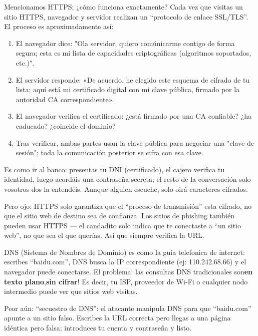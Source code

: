 
Mencionamos HTTPS; ¿cómo funciona exactamente? Cada vez que visitas un sitio HTTPS, navegador y servidor realizan un “protocolo de enlace SSL/TLS”. El proceso es aproximadamente así:

\begin{enumerate}
  \item El navegador dice: "Ola servidor, quiero comúnicarme contigo de forma segura; esta es mi lista de capacidades criptográficas (algoritmos soportados, etc.)".
  \item El servidor responde: «De acuerdo, he elegido este esquema de cifrado de tu lista; aquí está mi certificado digital con mi clave pública, firmado por la autoridad CA correspondiente».
  \item El navegador verifica el certificado: ¿está firmado por una CA confiable? ¿ha caducado? ¿coincide el dominio?
  \item Tras verificar, ambas partes usan la clave pública para negociar una "clave de sesión"; toda la comunicación posterior se cifra con esa clave.
\end{enumerate}

Es como ir al banco: presentas tu DNI (certificado), el cajero verifica tu identidad, luego acordáis una contraseña secreta; el resto de la conversación solo vosotros dos la entendéis. Aunque alguien escuche, solo oirá caracteres cifrados.

Pero ojo: HTTPS solo garantiza que el “proceso de transmisión” esta cifrado, no que el sitio web de destino sea de confianza. Los sitios de phishing también pueden usar HTTPS — el candadito solo indica que te conectaste a “un sitio web”, no que sea el que querías. Asi que siempre verifica la URL.


DNS (Sistema de Nombres de Dominio) es como la guía telefonica de internet: escribes “baidu.com”, DNS busca la IP correspondiente (ej: 110.242.68.66) y el navegador puede conectarse. El problema: las consultas DNS tradicionales son\textbf{en texto plano},\textbf{sin cifrar}! Es decir, tu ISP, proveedor de Wi-Fi o cualquier nodo intermedio puede ver que sitios web visitas.

Peor aún: “secuestro de DNS”: el atacante manipula DNS para que “baidu.com” apunte a un sitio falso. Escribes la URL correcta pero llegas a una página idéntica pero falsa; introduces tu cuenta y contraseña y listo.

